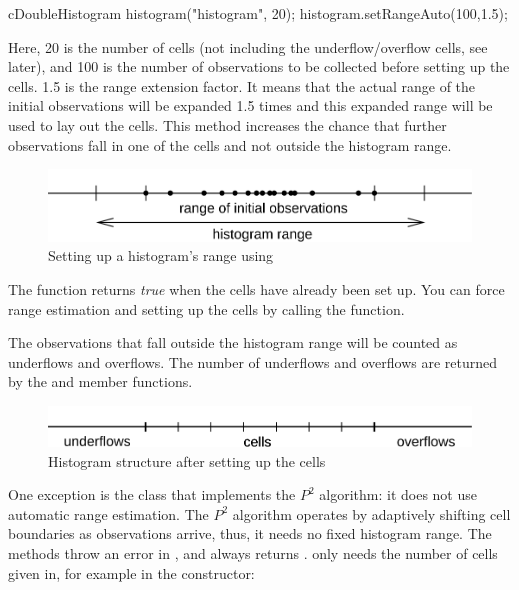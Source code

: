 \begin{cpp}
cDoubleHistogram histogram("histogram", 20);
histogram.setRangeAuto(100,1.5);
\end{cpp}

Here, 20 is the number of cells (not including the underflow/overflow
cells, see later), and 100 is the number of observations to be
collected before setting up the cells. 1.5 is the range extension
factor. It means that the actual range of the initial observations
will be expanded 1.5 times and this expanded range will be used to lay
out the cells. This method increases the chance that further
observations fall in one of the cells and not outside the histogram
range.

\begin{figure}[htbp]
  \begin{center}
    \includegraphics{figures/simlib-histogramrange}
    \caption{Setting up a histogram's range using }
  \end{center}
\end{figure}

The  function returns \textit{true} when the cells have
already been set up. You can force range estimation and setting
up the cells by calling the  function.

The observations that fall outside the histogram range will be counted
as underflows and overflows. The number of underflows and overflows
are returned by the  and 
member functions.

\begin{figure}[htbp]
\begin{center}
  \includegraphics{figures/simlib-histogramsetup}
  \caption{Histogram structure after setting up the cells}
\end{center}
\end{figure}

One exception is the  class that implements the $P^{2}$
algorithm: it does not use automatic range estimation. The $P^{2}$
algorithm operates by adaptively shifting cell boundaries as observations
arrive, thus, it needs no fixed histogram range. The 
methods throw an error in , and 
always returns .  only needs the number of cells
given in, for example in the constructor:

